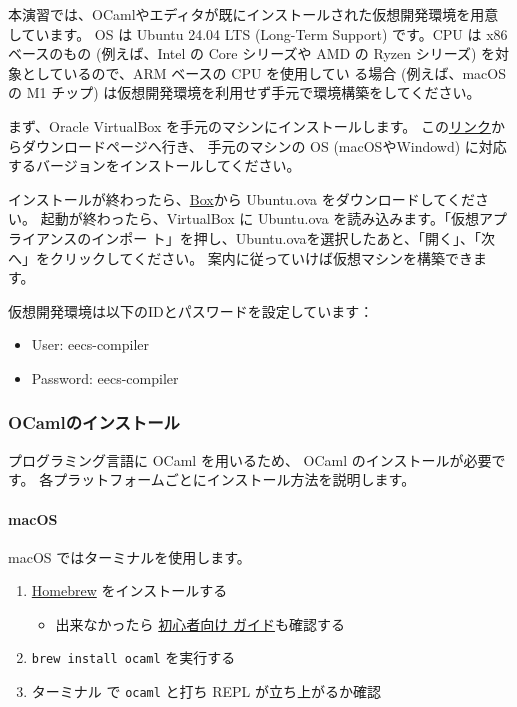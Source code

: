 \documentclass[a4paper,11pt]{jsarticle}
\begin{document}
本演習では、OCamlやエディタが既にインストールされた仮想開発環境を用意しています。
OS は Ubuntu 24.04 LTS (Long-Term Support) です。CPU は x86 ベースのもの (例えば、Intel の
Core シリーズや AMD の Ryzen シリーズ) を対象としているので、ARM ベースの CPU を使用してい
る場合 (例えば、macOS の M1 チップ) は仮想開発環境を利用せず手元で環境構築をしてください。

まず、Oracle VirtualBox を手元のマシンにインストールします。
この\href{https://www.virtualbox.org/wiki/Downloads}{リンク}からダウンロードページへ行き、
手元のマシンの OS (macOSやWindowd) に対応するバージョンをインストールしてください。

インストールが終わったら、\href{https://tmpuc.box.com/s/2b8nzqw2vhx047a488m26h1whn8wfdfz}{Box}から
Ubuntu.ova をダウンロードしてください。
起動が終わったら、VirtualBox に Ubuntu.ova を読み込みます。「仮想アプライアンスのインポー
ト」を押し、Ubuntu.ovaを選択したあと、「開く」、「次へ」をクリックしてください。
案内に従っていけば仮想マシンを構築できます。

仮想開発環境は以下のIDとパスワードを設定しています：

\begin{itemize}
\item User: eecs-compiler
\item Password: eecs-compiler
\end{itemize}

\subsubsection{OCamlのインストール}

プログラミング言語に OCaml を用いるため、 OCaml のインストールが必要です。
各プラットフォームごとにインストール方法を説明します。

\paragraph{macOS}

macOS ではターミナルを使用します。

\begin{enumerate}
\item \href{https://brew.sh/ja}{Homebrew} をインストールする
  \begin{itemize}
  \item 出来なかったら \href{https://zenn.dev/inablog/articles/5e790c9fbdad20}{初心者向け
      ガイド}も確認する
  \end{itemize}
\item \verb|brew install ocaml| を実行する
\item ターミナル で \verb|ocaml| と打ち REPL が立ち上がるか確認
\end{enumerate}
\end{document}
